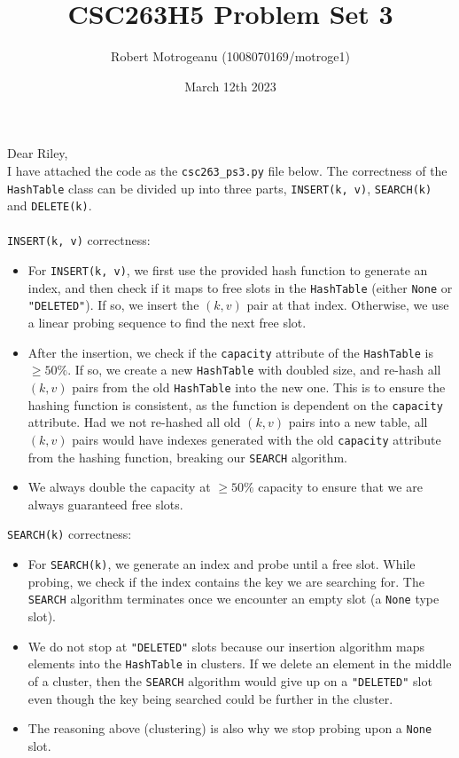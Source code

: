\documentclass{article}
\title{CSC263H5 Problem Set 3}
\author{Robert Motrogeanu (1008070169/motroge1)}
\date{March 12th 2023}
\begin{document}
\maketitle
\noindent Dear Riley, \\ 

\noindent I have attached the code as the \verb|csc263_ps3.py| file below. The correctness of the \verb|HashTable| class can be divided up into three parts, \verb|INSERT(k, v)|, \verb|SEARCH(k)| and \verb|DELETE(k)|. \\ \\ 
\verb|INSERT(k, v)| correctness:
\begin{itemize}
    \item For \verb|INSERT(k, v)|, we first use the provided hash function to generate an index, and then check if it maps to free slots in the \verb|HashTable| (either \verb|None| or \verb|"DELETED"|). If so, we insert the $(k, v)$ pair at that index. Otherwise, we use a linear probing sequence to find the next free slot.
    \item After the insertion, we check if the \verb|capacity| attribute of the \verb|HashTable| is $\geq50\%$. If so, we create a new \verb|HashTable| with doubled size, and re-hash all $(k, v)$ pairs from the old \verb|HashTable| into the new one. This is to ensure the hashing function is consistent, as the function is dependent on the \verb|capacity| attribute. Had we not re-hashed all old $(k, v)$ pairs into a new table, all $(k, v)$ pairs would have indexes generated with the old \verb|capacity| attribute from the hashing function, breaking our \verb|SEARCH| algorithm.
    \item We always double the capacity at $\geq50\%$ capacity to ensure that we are always guaranteed free slots.
\end{itemize}
\verb|SEARCH(k)| correctness:
\begin{itemize}
    \item For \verb|SEARCH(k)|, we generate an index and probe until a free slot. While probing, we check if the index contains the key we are searching for. The \verb|SEARCH| algorithm terminates once we encounter an empty slot (a \verb|None| type slot).
    \item We do not stop at \verb|"DELETED"| slots because our insertion algorithm maps elements into the \verb|HashTable| in clusters. If we delete an element in the middle of a cluster, then the \verb|SEARCH| algorithm would give up on a \verb|"DELETED"| slot even though the key being searched could be further in the cluster.
    \item The reasoning above (clustering) is also why we stop probing upon a \verb|None| slot.
\end{itemize}
\end{document}
